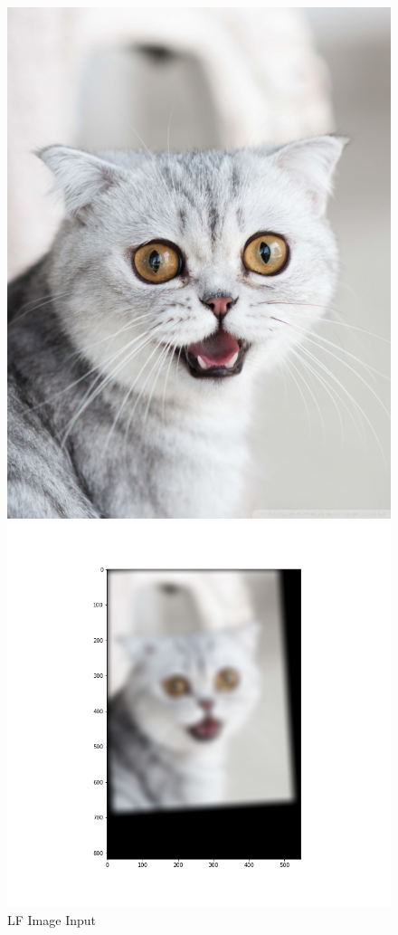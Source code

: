 \documentclass{article}
\begin{document}
\begin{figure}[!htb]
    \includegraphics[width=\linewidth]{cat.jpeg}
    \caption{LF Image Input}\label{fig:awesome_image1}
\endminipage
{}
    \includegraphics[width=\linewidth]{low cat.png}

\end{figure}
\end{document}
